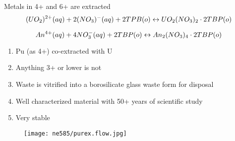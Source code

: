 \documentclass[aspectratio=1610,pdftex,dvipsnames,compress,xcolor={dvipsnames}]{beamer}
\begin{document}
\begin{frame}{Metals in 4+ and 6+ are extracted}
    \begin{equation}
        \Large
        (UO_2)^{2+}(aq) + 2(NO_3)^-(aq) + 2TPB(o) \leftrightarrow UO_2(NO_3)_2 \cdot 2TBP(o)
    \end{equation}
    
    \begin{equation}
        \Large
        An^{4+}(aq) + 4NO_3^-(aq) + 2TBP(o) \leftrightarrow An_2(NO_3)_4 \cdot 2TBP(o)
    \end{equation}

    \vspace*{\fill}

    \begin{enumerate}[topsep=0pt,itemsep=18pt,leftmargin=*,label=(\arabic*)]
        \item[]Pu (as 4+) co-extracted with U
        \item[]Anything 3+ or lower is not
        \item[]Waste is vitrified into a borosilicate glass waste form for disposal
        \item[]Well characterized material with 50+ years of scientific study
        \item[]Very stable
    \end{enumerate}
\end{frame}


\begin{frame}{}
    \begin{figure}
        \centering
        \texttt{[image: ne585/purex.flow.jpg]}
    \end{figure}
\end{frame}
\end{document}

